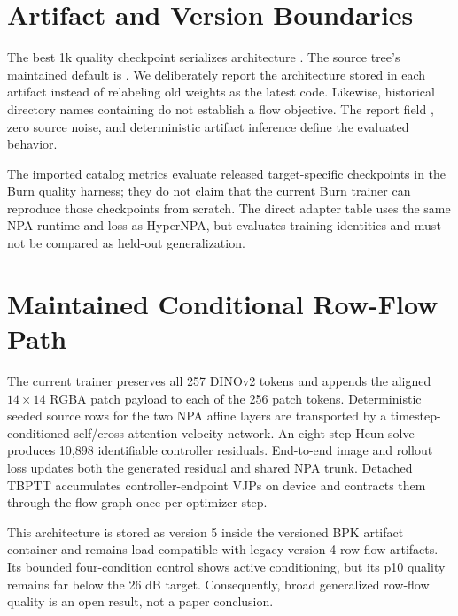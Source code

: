 \documentclass[sigconf,nonacm]{acmart}
\begin{document}
\section{Artifact and Version Boundaries}

The best 1k quality checkpoint serializes architecture
. The source tree's
maintained default is
. We deliberately
report the architecture stored in each artifact instead of relabeling old
weights as the latest code. Likewise, historical directory names containing
 do not establish a flow objective. The report field
, zero source noise, and deterministic
artifact inference define the evaluated behavior.

The imported catalog metrics evaluate released target-specific checkpoints in
the Burn quality harness; they do not claim that the current Burn trainer can
reproduce those checkpoints from scratch. The direct adapter table uses the
same NPA runtime and loss as HyperNPA, but evaluates training identities and
must not be compared as held-out generalization.

\section{Maintained Conditional Row-Flow Path}
\label{app:row-flow}

The current trainer preserves all 257 DINOv2 tokens and appends the aligned
$14\times14$ RGBA patch payload to each of the 256 patch tokens. Deterministic
seeded source rows for the two NPA affine layers are transported by a
timestep-conditioned self/cross-attention velocity network. An eight-step
Heun solve produces 10,898 identifiable controller residuals. End-to-end image
and rollout loss updates both the generated residual and shared NPA trunk.
Detached TBPTT accumulates controller-endpoint VJPs on device and contracts
them through the flow graph once per optimizer step.

This architecture is stored as version 5 inside the versioned BPK artifact
container and remains load-compatible with legacy version-4 row-flow
artifacts. Its bounded four-condition control shows active conditioning, but
its p10 quality remains far below the 26 dB target. Consequently, broad
generalized row-flow quality is an open result, not a paper conclusion.



\end{document}
